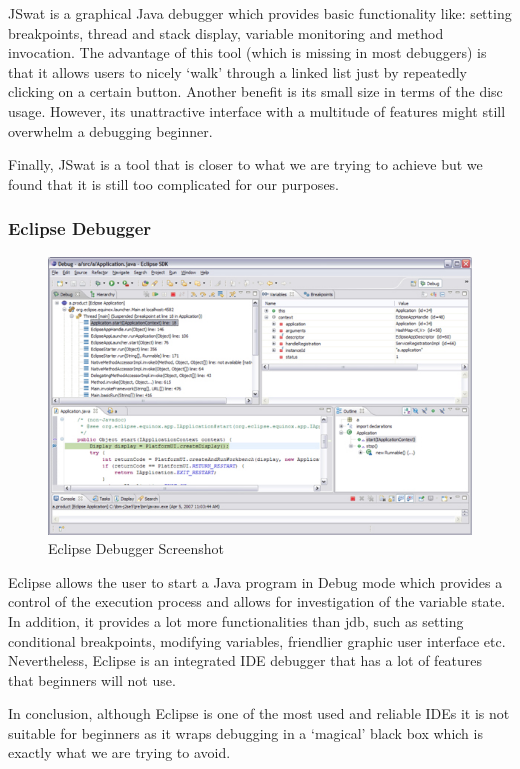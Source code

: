 \documentclass[11pt, a4paper]{article}
\begin{document}
JSwat is a graphical Java debugger which provides basic functionality like: setting breakpoints, thread and stack display, variable monitoring and method invocation.
The advantage of this tool (which is missing in most debuggers) is that it allows users to nicely `walk' through a linked list just by repeatedly clicking on a certain button.
Another benefit is its small size in terms of the disc usage.
However, its unattractive interface with a multitude of features might still overwhelm a debugging beginner.

Finally, JSwat is a tool that is closer to what we are trying to achieve but we found that it is still too complicated for our purposes.

\subsubsection{Eclipse Debugger}
\begin{figure}[h!]
\centering
\includegraphics[width=125mm]{eclipse.jpg}
\caption{Eclipse Debugger Screenshot}
\end{figure}

Eclipse allows the user to start a Java program in Debug mode which provides a control of the execution process and allows for investigation of the variable state.
In addition, it provides a lot more functionalities than jdb, such as setting conditional breakpoints, modifying variables, friendlier graphic user interface etc.
Nevertheless, Eclipse is an integrated IDE debugger that has a lot of features that beginners will not use.

In conclusion, although Eclipse is one of the most used and reliable IDEs it is not suitable for beginners as it wraps debugging in a `magical' black box which is exactly what we are trying to avoid.
\end{document}
